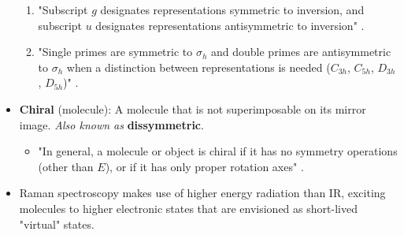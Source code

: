 \documentclass[../notes.tex]{subfiles}
\begin{document}
\begin{itemize}
\begin{enumerate}
        \item "Subscript $g$ designates representations symmetric to inversion, and subscript $u$ designates representations antisymmetric to inversion" \parencite[100]{bib:MiesslerFischerTarr}.
        \item "Single primes are symmetric to $\sigma_h$ and double primes are antisymmetric to $\sigma_h$ when a distinction between representations is needed ($C_{3h}$, $C_{5h}$, $D_{3h}$, $D_{5h}$)" \parencite[100]{bib:MiesslerFischerTarr}.
    \end{enumerate}
    \item {}\textbf{Chiral} (molecule): A molecule that is not superimposable on its mirror image. \emph{Also known as} \textbf{dissymmetric}.
    \begin{itemize}
        \item "In general, a molecule or object is chiral if it has no symmetry operations (other than $E$), or if it has only proper rotation axes" \parencite[100]{bib:MiesslerFischerTarr}.
    \end{itemize}
    \item Raman spectroscopy makes use of higher energy radiation than IR, exciting molecules to higher electronic states that are envisioned as short-lived "virtual" states.
\end{itemize}
\end{document}
